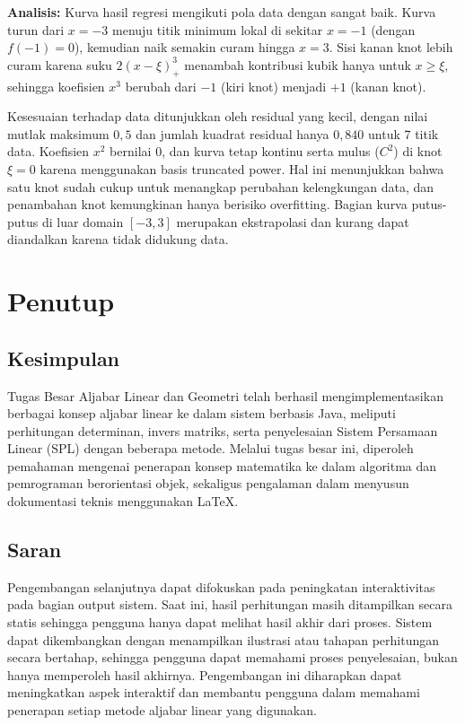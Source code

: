 \documentclass[12pt,a4paper]{report}
\begin{document}
\textbf{Analisis:}
Kurva hasil regresi mengikuti pola data dengan sangat baik. Kurva turun dari $x=-3$ menuju titik minimum lokal di sekitar $x=-1$ (dengan $f(-1)=0$), kemudian naik semakin curam hingga $x=3$. Sisi kanan knot lebih curam karena suku $2(x-\xi)_+^3$ menambah kontribusi kubik hanya untuk $x \ge \xi$, sehingga koefisien $x^3$ berubah dari $-1$ (kiri knot) menjadi $+1$ (kanan knot).

Kesesuaian terhadap data ditunjukkan oleh residual yang kecil, dengan nilai mutlak maksimum $0{,}5$ dan jumlah kuadrat residual hanya $0{,}840$ untuk 7 titik data. Koefisien $x^2$ bernilai $0$, dan kurva tetap kontinu serta mulus ($C^2$) di knot $\xi=0$ karena menggunakan basis truncated power. Hal ini menunjukkan bahwa satu knot sudah cukup untuk menangkap perubahan kelengkungan data, dan penambahan knot kemungkinan hanya berisiko overfitting. Bagian kurva putus-putus di luar domain $[-3,3]$ merupakan ekstrapolasi dan kurang dapat diandalkan karena tidak didukung data.

\chapter{Penutup}

\section{Kesimpulan}

Tugas Besar Aljabar Linear dan Geometri telah berhasil mengimplementasikan berbagai konsep aljabar linear ke dalam sistem berbasis Java, meliputi perhitungan determinan, invers matriks, serta penyelesaian Sistem Persamaan Linear (SPL) dengan beberapa metode. Melalui tugas besar ini, diperoleh pemahaman mengenai penerapan konsep matematika ke dalam algoritma dan pemrograman berorientasi objek, sekaligus pengalaman dalam menyusun dokumentasi teknis menggunakan \LaTeX.

\section{Saran}

Pengembangan selanjutnya dapat difokuskan pada peningkatan interaktivitas pada bagian output sistem. Saat ini, hasil perhitungan masih ditampilkan secara statis sehingga pengguna hanya dapat melihat hasil akhir dari proses. Sistem dapat dikembangkan dengan menampilkan ilustrasi atau tahapan perhitungan secara bertahap, sehingga pengguna dapat memahami proses penyelesaian, bukan hanya memperoleh hasil akhirnya. Pengembangan ini diharapkan dapat meningkatkan aspek interaktif dan membantu pengguna dalam memahami penerapan setiap metode aljabar linear yang digunakan.
\end{document}
